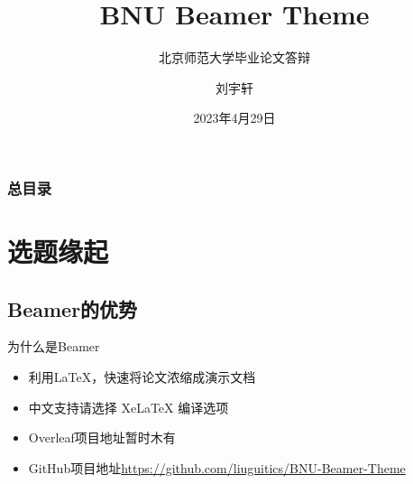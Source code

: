 \documentclass{beamer}
\author[Yuxuan Liu]{刘宇轩}
\title{BNU Beamer Theme}
\subtitle{北京师范大学毕业论文答辩}
\institute[北京师范大学 文学院]{文学院\\语言学及应用语言学研究所}
\date{2023年4月29日}
\begin{document}


\begin{frame}
    \titlepage
\end{frame}

\begin{frame}
    \frametitle{总目录}
    \begin{multicols}{2}
     \tableofcontents[hideallsubsections]
    \end{multicols}
\end{frame}

\section{选题缘起}
\subsection{Beamer的优势}
\begin{frame}{为什么是Beamer}
    \begin{itemize}[<+-| alert@+>] %
        \item 利用\LaTeX{}，快速将论文浓缩成演示文档
        \item 中文支持请选择 Xe\LaTeX{} 编译选项 
        \item Overleaf项目地址暂时木有
        \item GitHub项目地址\url{https://github.com/liuguitics/BNU-Beamer-Theme}
    \end{itemize}
\end{frame}
\end{document}
